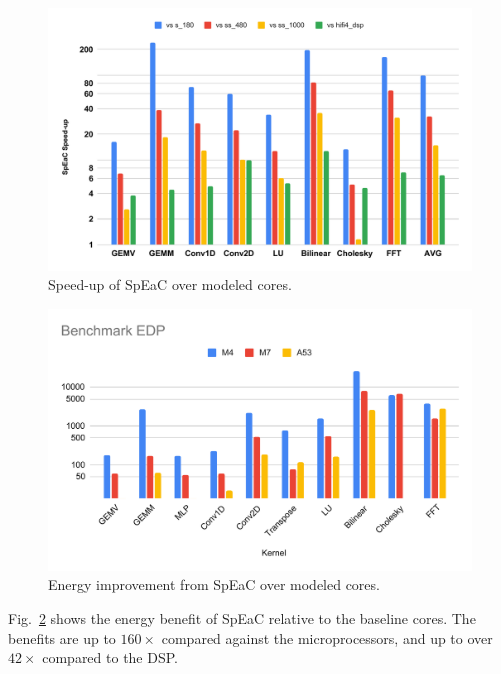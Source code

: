 \begin{figure}
    \centering
    \includegraphics[width=\linewidth]{./figs/speedup.pdf}
    \caption{\small
    Speed-up of SpEaC over modeled cores.
    }
    \label{fig:earable_results}
\end{figure}

\begin{figure}
    \centering
    \includegraphics[width=\linewidth]{./figs/edp.pdf}
    \caption{\small
    Energy improvement from SpEaC over modeled cores.
    }
    \label{fig:earable_edp}
\end{figure}

Fig.~\ref{fig:earable_edp} shows the energy benefit of SpEaC relative to the
baseline cores. The benefits are up to \(160\times\) compared against the
microprocessors, and up to over \(42\times\) compared to the DSP.

